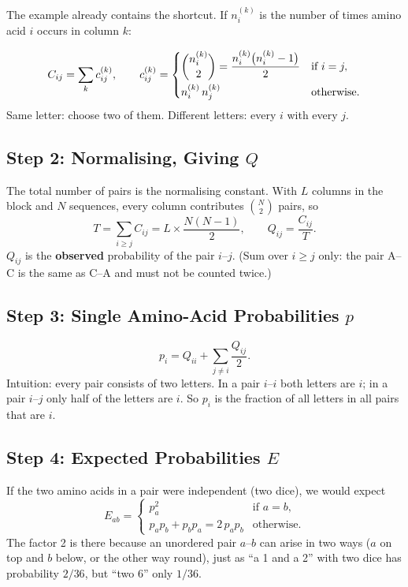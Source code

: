 \documentclass[11pt, oneside]{book}
\let\originalsubsection\subsection
\renewcommand{\subsection}{\Needspace{6\baselineskip}\originalsubsection}
\begin{document}
The example already contains the shortcut. If $n_i^{(k)}$ is the number of
times amino acid $i$ occurs in column $k$:

\begin{thmbox}[title={Shortcut for $C$}]
\[
  C_{ij} = \sum_{k} c_{ij}^{(k)},
  \qquad
  c_{ij}^{(k)} =
  \begin{cases}
    \dbinom{n_i^{(k)}}{2} = \dfrac{n_i^{(k)}\bigl(n_i^{(k)} - 1\bigr)}{2} & \text{if } i = j,\\[2ex]
    n_i^{(k)}\, n_j^{(k)} & \text{otherwise.}
  \end{cases}
\]
Same letter: choose two of them. Different letters: every $i$ with every $j$.
\end{thmbox}

\subsection{Step 2: Normalising, Giving \texorpdfstring{$Q$}{Q}}

The total number of pairs is the normalising constant. With $L$ columns in the
block and $N$ sequences, every column contributes $\binom{N}{2}$ pairs, so
\[
  T = \sum_{i \ge j} C_{ij} = L \times \frac{N(N-1)}{2},
  \qquad
  Q_{ij} = \frac{C_{ij}}{T}.
\]
$Q_{ij}$ is the \textbf{observed} probability of the pair $i$--$j$. (Sum over
$i \ge j$ only: the pair A--C is the same as C--A and must not be counted
twice.)

\subsection{Step 3: Single Amino-Acid Probabilities \texorpdfstring{$p$}{p}}

\[
  p_i = Q_{ii} + \sum_{j \ne i} \frac{Q_{ij}}{2}.
\]
Intuition: every pair consists of two letters. In a pair $i$--$i$ both letters
are $i$; in a pair $i$--$j$ only half of the letters are $i$. So $p_i$ is the
fraction of all letters in all pairs that are $i$.

\subsection{Step 4: Expected Probabilities \texorpdfstring{$E$}{E}}

If the two amino acids in a pair were independent (two dice), we would expect
\[
  E_{ab} =
  \begin{cases}
    p_a^2 & \text{if } a = b,\\
    p_a p_b + p_b p_a = 2\, p_a p_b & \text{otherwise.}
  \end{cases}
\]
The factor 2 is there because an unordered pair $a$--$b$ can arise in two ways
($a$ on top and $b$ below, or the other way round), just as ``a 1 and a 2'' with
two dice has probability $2/36$, but ``two 6'' only $1/36$.
\end{document}
